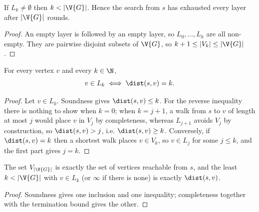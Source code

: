 \begin{lemma}[Termination]
  \label{lem:bfs-termination}
  \leanok
  If $L_k \neq \emptyset$ then $k < |\V{G}|$. Hence the search from $s$ has exhausted every
  layer after $|\V{G}|$ rounds.
\end{lemma}
\begin{proof}
  \leanok
  An empty layer is followed by an empty layer, so $L_0, \dots, L_k$ are all non-empty.
  They are pairwise disjoint subsets of $\V{G}$, so $k + 1 \le |V_k| \le |\V{G}|$.
\end{proof}

\begin{theorem}
  \label{thm:bfs-layers-spheres}
  \leanok
  For every vertex $v$ and every $k \in \N$,
  \[
    v \in L_k \iff \dist(s, v) = k .
  \]
\end{theorem}
\begin{proof}
  \leanok
  Let $v \in L_k$. Soundness gives $\dist(s, v) \le k$. For the reverse inequality there
  is nothing to show when $k = 0$; when $k = j + 1$, a walk from $s$ to $v$ of length at
  most $j$ would place $v$ in $V_j$ by completeness, whereas $L_{j+1}$ avoids $V_j$ by
  construction, so $\dist(s, v) > j$, i.e. $\dist(s, v) \ge k$. Conversely, if
  $\dist(s, v) = k$ then a shortest walk places $v \in V_k$, so $v \in L_j$ for some
  $j \le k$, and the first part gives $j = k$.
\end{proof}

\begin{theorem}
  \label{thm:bfs-correct}
  \leanok
  The set $V_{|\V{G}|}$ is exactly the set of vertices reachable from $s$, and the least
  $k < |\V{G}|$ with $v \in L_k$ (or $\infty$ if there is none) is exactly $\dist(s, v)$.
\end{theorem}
\begin{proof}
  \leanok
  Soundness gives one inclusion and one inequality; completeness together with the
  termination bound gives the other.
\end{proof}

